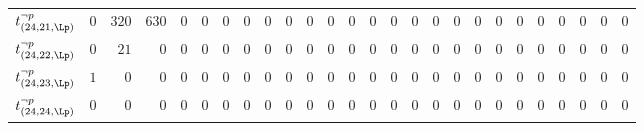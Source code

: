 \begin{tabular}{r|rrrrrrrrrrrrrrrrrrrrrrrrr}
  $t^{\neg p}_{(24,21,\Lp)}$ & $0$ & $320$ & $630$ & $0$ & $0$ & $0$ & $0$ & $0$ & $0$ & $0$ & $0$ & $0$ & $0$ & $0$ & $0$ & $0$ & $0$ & $0$ & $0$ & $0$ & $0$ & $0$ & $0$ & $0$ & $0$ \\
  $t^{\neg p}_{(24,22,\Lp)}$ & $0$ & $21$ & $0$ & $0$ & $0$ & $0$ & $0$ & $0$ & $0$ & $0$ & $0$ & $0$ & $0$ & $0$ & $0$ & $0$ & $0$ & $0$ & $0$ & $0$ & $0$ & $0$ & $0$ & $0$ & $0$ \\
  $t^{\neg p}_{(24,23,\Lp)}$ & $1$ & $0$ & $0$ & $0$ & $0$ & $0$ & $0$ & $0$ & $0$ & $0$ & $0$ & $0$ & $0$ & $0$ & $0$ & $0$ & $0$ & $0$ & $0$ & $0$ & $0$ & $0$ & $0$ & $0$ & $0$ \\
  $t^{\neg p}_{(24,24,\Lp)}$ & $0$ & $0$ & $0$ & $0$ & $0$ & $0$ & $0$ & $0$ & $0$ & $0$ & $0$ & $0$ & $0$ & $0$ & $0$ & $0$ & $0$ & $0$ & $0$ & $0$ & $0$ & $0$ & $0$ & $0$ & $0$ \\
\end{tabular}
